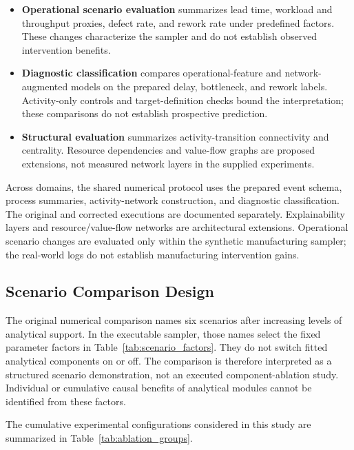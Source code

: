 \documentclass[pdflatex,iicol,Numbered,sn-basic]{sn-jnl}
\begin{document}
\begin{itemize}

\item \textbf{Operational scenario evaluation} summarizes lead time, workload and throughput proxies, defect rate, and rework rate under predefined factors. These changes characterize the sampler and do not establish observed intervention benefits.

\item \textbf{Diagnostic classification} compares operational-feature and network-augmented models on the prepared delay, bottleneck, and rework labels. Activity-only controls and target-definition checks bound the interpretation; these comparisons do not establish prospective prediction.

\item \textbf{Structural evaluation} summarizes activity-transition connectivity and centrality. Resource dependencies and value-flow graphs are proposed extensions, not measured network layers in the supplied experiments.

\end{itemize}

Across domains, the shared numerical protocol uses the prepared event schema, process summaries, activity-network construction, and diagnostic classification. The original and corrected executions are documented separately. Explainability layers and resource/value-flow networks are architectural extensions. Operational scenario changes are evaluated only within the synthetic manufacturing sampler; the real-world logs do not establish manufacturing intervention gains.

\subsection{Scenario Comparison Design}
\label{subsec:ablation}

The original numerical comparison names six scenarios after increasing levels of analytical support. In the executable sampler, those names select the fixed parameter factors in Table~\ref{tab:scenario_factors}. They do not switch fitted analytical components on or off. The comparison is therefore interpreted as a structured scenario demonstration, not an executed component-ablation study. Individual or cumulative causal benefits of analytical modules cannot be identified from these factors.

The cumulative experimental configurations considered in this study are summarized in Table~\ref{tab:ablation_groups}.
\end{document}
